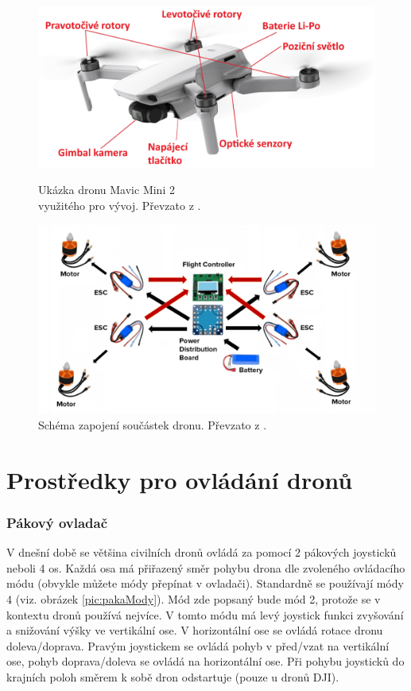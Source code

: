 \begin{figure}[h]
  \begin{minipage}{0.5\textwidth}
    \centering
    \includegraphics[width=\textwidth]{obrazky-figures/drony/djiMavicMiniPopis.jpg}
    \caption{Ukázka dronu Mavic Mini 2 \\využitého pro vývoj. Převzato z \cite{mavici2pic}.}
    \label{pic:mavicMini}
  \end{minipage}
  \begin{minipage}{0.45\textwidth}
    \centering
    \includegraphics[width=\textwidth]{obrazky-figures/drony/DroneIntenals.png}
    \caption{Schéma zapojení součástek dronu. Převzato z \cite{droneIntrnals}.}
    \label{fig:dronSchema}
  \end{minipage}
\end{figure}

\section{Prostředky pro ovládání dronů} \label{sec:ovladace}
\subsubsection{Pákový ovladač}
V dnešní době se většina civilních dronů ovládá za pomocí 2 pákových joysticků neboli 4 os. Každá osa má přiřazený směr pohybu drona dle zvoleného ovládacího módu (obvykle můžete módy přepínat v ovladači). Standardně se používají módy 4 (viz. obrázek \ref{pic:pakaMody}). Mód zde popsaný bude mód 2, protože se v kontextu dronů používá nejvíce. V tomto módu má levý joystick funkci zvyšování a snižování výšky ve vertikální ose. V horizontální ose se ovládá rotace dronu doleva/doprava. Pravým joystickem se ovládá pohyb v před/vzat na vertikální ose, pohyb doprava/doleva se ovládá na horizontální ose. Při pohybu joysticků do krajních poloh směrem k sobě dron odstartuje (pouze u dronů DJI).

